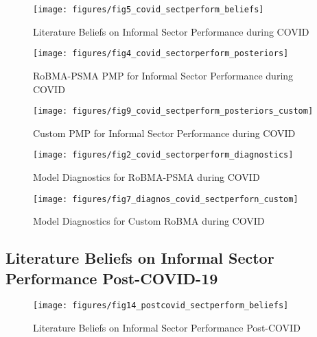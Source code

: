 \documentclass[12pt, article]{article}
\begin{document}
    \begin{figure}[H]
        \centering
        \texttt{[image: figures/fig5\_covid\_sectperform\_beliefs]}
        \caption{Literature Beliefs on Informal Sector Performance during COVID}
        \label{fig4:beliefs-inf-sector-perform-covid}
    \end{figure}

    \begin{figure}[H]
        \centering
        \texttt{[image: figures/fig4\_covid\_sectorperform\_posteriors]}
        \caption{RoBMA-PSMA PMP for Informal Sector Performance during COVID}
        \label{fig5:robma-psma-pmp-covid-sectorperform-posteriors}
    \end{figure}

    \begin{figure}[H]
        \centering
        \texttt{[image: figures/fig9\_covid\_sectperform\_posteriors\_custom]}
        \caption{Custom PMP for Informal Sector Performance during COVID}
        \label{fig6:custome-pmp-covid-sectorperform-posteriors}
    \end{figure}

    \begin{figure}[H]
        \centering
        \texttt{[image: figures/fig2\_covid\_sectorperform\_diagnostics]}
        \caption{Model Diagnostics for RoBMA-PSMA during COVID}
        \label{fig7:diagnostics-robma-psma-covid-sectorperform}
    \end{figure}

    \begin{figure}[H]
        \centering
        \texttt{[image: figures/fig7\_diagnos\_covid\_sectperforn\_custom]}
        \caption{Model Diagnostics for Custom RoBMA during COVID}
        \label{fig8:diagnostics-custom-pmp-covid-sectorperform}
    \end{figure}

    \subsection{Literature Beliefs on Informal Sector Performance Post-COVID-19}\label{subsec4.2:literature-beliefs-on-informal-sector-performance-post-covid-19}

    \begin{figure}[H]
        \centering
        \texttt{[image: figures/fig14\_postcovid\_sectperform\_beliefs]}
        \caption{Literature Beliefs on Informal Sector Performance Post-COVID}
        \label{fig9:beliefs-inf-sector-perform-postcovid}
    \end{figure}
\end{document}
